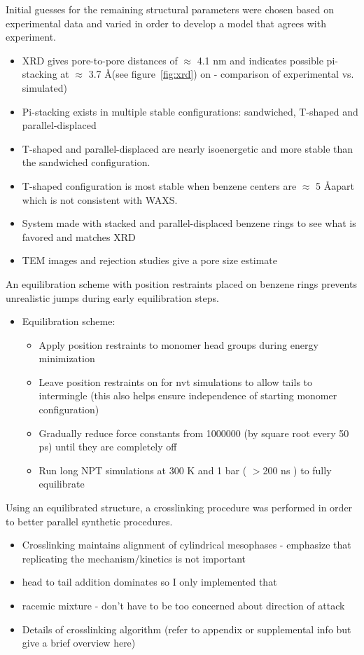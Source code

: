 \documentclass{article}
\newcommand{\angstrom}{\textup{\AA}}
\begin{document}
	\noindent Initial guesses for the remaining structural parameters were chosen based on experimental data and varied in order to develop a model that agrees with experiment. 
	\begin{itemize}
		\item XRD gives pore-to-pore distances of $\approx$ 4.1 nm and indicates possible pi-stacking at $\approx$ 3.7 \angstrom (see figure~\ref{fig:xrd}) on - comparison of experimental vs. simulated)
		\item Pi-stacking exists in multiple stable configurations: sandwiched, T-shaped and parallel-displaced
		\item T-shaped and parallel-displaced are nearly isoenergetic and more stable than the sandwiched configuration.
		\item T-shaped configuration is most stable when benzene centers are $\approx$ 5 \angstrom apart which is not consistent with WAXS. %
		\item System made with stacked and parallel-displaced benzene rings to see what is favored and matches XRD
		\item TEM images and rejection studies give a pore size estimate
	\end{itemize}

	An equilibration scheme with position restraints placed on benzene rings prevents unrealistic jumps during early equilibration steps.
	\begin{itemize}
		\item Equilibration scheme:
		\begin{itemize}
			\item Apply position restraints to monomer head groups during energy minimization 
			\item Leave position restraints on for nvt simulations to allow tails to intermingle (this also helps ensure independence of starting monomer configuration)
			\item Gradually reduce force constants from 1000000 (by square root every 50 ps) until they are completely off
			\item Run long NPT simulations at 300 K and 1 bar ( $>$200 ns ) to fully equilibrate 
		\end{itemize}
	\end{itemize}
	
	Using an equilibrated structure, a crosslinking procedure was performed in order to better parallel synthetic procedures. 
	\begin{itemize}
		\item Crosslinking maintains alignment of cylindrical mesophases - emphasize that replicating the mechanism/kinetics is not important 
		\item head to tail addition dominates so I only implemented that
		\item racemic mixture - don't have to be too concerned about direction of attack 
		\item Details of crosslinking algorithm (refer to appendix or supplemental info but give a brief overview here)
	\end{itemize}  
	
\end{document}
